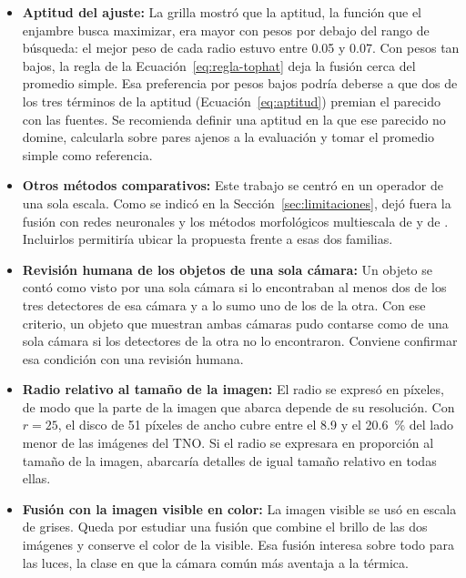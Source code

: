 \begin{itemize}
\item \textbf{Aptitud del ajuste:} La grilla mostró que la aptitud, la función que el enjambre
busca maximizar, era mayor con pesos por debajo del rango de búsqueda: el mejor peso de cada radio
estuvo entre 0.05 y 0.07. Con pesos tan bajos, la regla de la Ecuación~\eqref{eq:regla-tophat} deja la
fusión cerca del promedio simple. Esa preferencia por pesos bajos podría deberse a que dos de los tres
términos de la aptitud (Ecuación~\ref{eq:aptitud}) premian el parecido con las fuentes. Se recomienda definir una
aptitud en la que ese parecido no domine, calcularla sobre pares ajenos a la evaluación y tomar el
promedio simple como referencia.

\item \textbf{Otros métodos comparativos:} Este trabajo se centró en un operador de una sola escala.
Como se indicó en la Sección~\ref{sec:limitaciones}, dejó fuera la fusión con redes neuronales y los
métodos morfológicos multiescala de \textcite{bai2013} y de \textcite{roman2020}. Incluirlos permitiría ubicar la propuesta
frente a esas dos familias.

\item \textbf{Revisión humana de los objetos de una sola cámara:} Un objeto se contó como visto por una
sola cámara si lo encontraban al menos dos de los tres detectores de esa cámara y a lo sumo uno de los
de la otra. Con ese criterio, un objeto que muestran ambas cámaras pudo contarse como de una sola cámara
si los detectores de la otra no lo encontraron. Conviene confirmar esa condición con una revisión
humana.

\item \textbf{Radio relativo al tamaño de la imagen:} El radio se expresó en píxeles, de modo que la
parte de la imagen que abarca depende de su resolución. Con $r = 25$, el disco de 51 píxeles de ancho
cubre entre el 8.9 y el 20.6~\% del lado menor de las imágenes del TNO. Si el radio se expresara en
proporción al tamaño de la imagen, abarcaría detalles de igual tamaño relativo en todas ellas.

\item \textbf{Fusión con la imagen visible en color:} La imagen visible se usó en escala de grises.
Queda por estudiar una fusión que combine el brillo de las dos imágenes y conserve el color de la
visible. Esa fusión interesa sobre todo para las luces, la clase en que la cámara común más aventaja a
la térmica.
\end{itemize}
